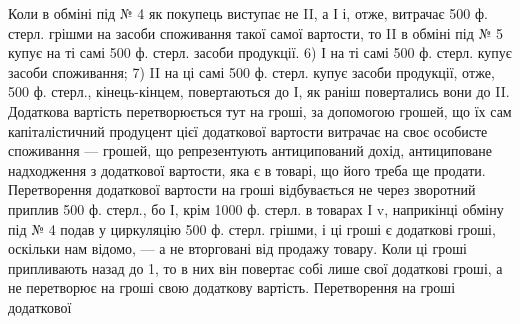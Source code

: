 Коли в обміні під № 4 як покупець виступає не II, а І і, отже, витрачає
500 ф. стерл. грішми на засоби споживання такої самої вартости, то II
в обміні під № 5 купує на ті самі 500 ф. стерл. засоби продукції.
6) І на ті самі 500 ф. стерл. купує засоби споживання; 7) II на ці самі
500 ф. стерл. купує засоби продукції, отже, 500 ф. стерл., кінець-кінцем,
повертаються до І, як раніш повертались вони до II. Додаткова вартість
перетворюється тут на гроші, за допомогою грошей, що їх сам капіталістичний
продуцент цієї додаткової вартости витрачає на своє особисте
споживання — грошей, що репрезентують антиципований дохід, антициповане
надходження з додаткової вартости, яка є в товарі, що його треба
ще продати. Перетворення додаткової вартости на гроші відбувається не
через зворотний приплив 500 ф. стерл., бо І, крім 1000 ф. стерл.
в товарах І v, наприкінці обміну під № 4 подав у циркуляцію 500 ф.
стерл. грішми, і ці гроші є додаткові гроші, оскільки нам відомо, — а не
вторговані від продажу товару. Коли ці гроші припливають назад до 1,
то в них він повертає собі лише свої додаткові гроші, а не перетворює
на гроші свою додаткову вартість. Перетворення на гроші додаткової
\parbreak{}  %
